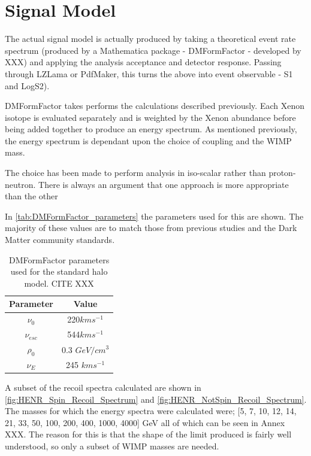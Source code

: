 \section{Signal Model}
\par
The actual signal model is actually produced by taking a theoretical event rate spectrum (produced by a Mathematica package - DMFormFactor - developed by XXX) and applying the analysis acceptance and detector response.
Passing through LZLama or PdfMaker, this turns the above into event observable - S1 and LogS2).
\par
DMFormFactor takes performs the calculations described previously.
Each Xenon isotope is evaluated separately and is weighted by the Xenon abundance before being added together to produce an energy spectrum.
As mentioned previously, the energy spectrum is dependant upon the choice of coupling and the WIMP mass.
\par
The choice has been made to perform analysis in iso-scalar rather than proton-neutron. 
There is always an argument that one approach is more appropriate than the other
\par
In \autoref{tab:DMFormFactor_parameters} the parameters used for this are shown.
The majority of these values are to match those from previous studies and the Dark Matter community standards.

\begin{table}[]
    \centering
    \begin{tabular}{c|c}
        Parameter   & Value  \\ \hline
        $\nu_0$     & 220$km s^{-1}$ \\
        $\nu_{esc}$ & 544$km s^{-1}$ \\
        $\rho_{0}$     & 0.3 $GeV/cm^{3}$ \\
        $\nu_E$     & 245 $km s^{-1}$ 
    \end{tabular}
    \caption{DMFormFactor parameters used for the standard halo model. CITE XXX}
    \label{tab:DMFormFactor_parameters}
\end{table}


\par
A subset of the recoil spectra calculated are shown in \autoref{fig:HENR_Spin_Recoil_Spectrum} and \autoref{fig:HENR_NotSpin_Recoil_Spectrum}.
The masses for which the energy spectra were calculated were;
[5, 7, 10, 12, 14, 21, 33, 50, 100, 200, 400, 1000, 4000] GeV all of which can be seen in Annex XXX.
The reason for this is that the shape of the limit produced is fairly well understood, so only a subset of WIMP masses are needed.

